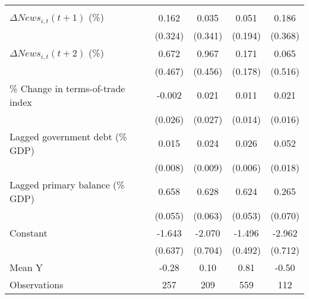 {\begin{tabular}{l*{4}{c}}
                    &                     &                     &                     &                     \\
\addlinespace
$ \Delta News_{i,t}(t+1)$ (\%)&       0.162         &       0.035         &       0.051         &       0.186         \\
                    &     (0.324)         &     (0.341)         &     (0.194)         &     (0.368)         \\
\addlinespace
$ \Delta News_{i,t}(t+2)$ (\%)&       0.672         &       0.967\sym{*}  &       0.171         &       0.065         \\
                    &     (0.467)         &     (0.456)         &     (0.178)         &     (0.516)         \\
\addlinespace
\% Change in terms-of-trade index&      -0.002         &       0.021         &       0.011         &       0.021         \\
                    &     (0.026)         &     (0.027)         &     (0.014)         &     (0.016)         \\
\addlinespace
Lagged government debt (\% GDP)&       0.015\sym{*}  &       0.024\sym{**} &       0.026\sym{***}&       0.052\sym{**} \\
                    &     (0.008)         &     (0.009)         &     (0.006)         &     (0.018)         \\
\addlinespace
Lagged primary balance (\% GDP)&       0.658\sym{***}&       0.628\sym{***}&       0.624\sym{***}&       0.265\sym{***}\\
                    &     (0.055)         &     (0.063)         &     (0.053)         &     (0.070)         \\
\addlinespace
Constant            &      -1.643\sym{**} &      -2.070\sym{**} &      -1.496\sym{***}&      -2.962\sym{***}\\
                    &     (0.637)         &     (0.704)         &     (0.492)         &     (0.712)         \\
\midrule
Mean Y              &       -0.28         &        0.10         &        0.81         &       -0.50         \\
Observations        &         257         &         209         &         559         &         112         \\
\bottomrule
\end{tabular}
}
